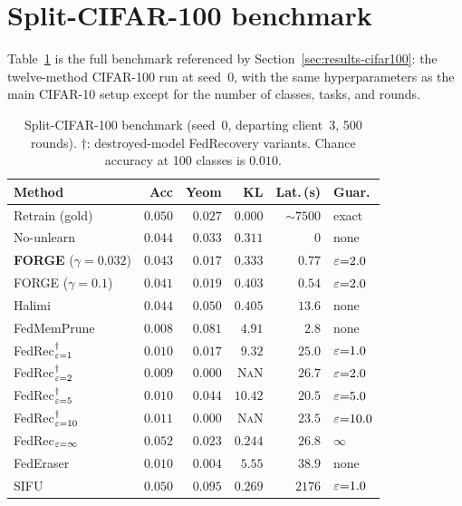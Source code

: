 \section{Split-CIFAR-100 benchmark}
\label{app:cifar100-table}

Table~\ref{tab:cifar100-benchmark} is the full benchmark referenced by
Section~\ref{sec:results-cifar100}: the twelve-method CIFAR-100 run at seed~$0$,
with the same hyperparameters as the main CIFAR-10 setup except for the number of
classes, tasks, and rounds.

\begin{table}[h]
\centering
\scriptsize
\setlength{\tabcolsep}{3pt}
\begin{tabular}{lrrrrl}
\toprule
Method & Acc & Yeom & KL & Lat.\,(s) & Guar. \\
\midrule
Retrain (gold) & $0.050$ & $0.027$ & $0.000$ & $\sim 7500$ & exact \\
No-unlearn     & $0.044$ & $0.033$ & $0.311$ & $0$         & none \\
\textbf{FORGE} ($\gamma{=}0.032$) & $\mathbf{0.043}$ & $\mathbf{0.017}$ & $\mathbf{0.333}$ & $\mathbf{0.77}$ & $\varepsilon{=}2.0$ \\
FORGE ($\gamma{=}0.1$)            & $0.041$ & $0.019$ & $0.403$ & $0.54$ & $\varepsilon{=}2.0$ \\
\midrule
Halimi \cite{halimi2022}              & $0.044$ & $0.050$ & $0.405$ & $13.6$ & none \\
FedMemPrune \cite{wei2026fedmemprune} & $0.008$ & $0.081$ & $4.91$  & $2.8$  & none \\
FedRec$^{\dag}_{\varepsilon{=}1}$            & $0.010$ & $0.017$ & $9.32$  & $25.0$ & $\varepsilon{=}1.0$ \\
FedRec$^{\dag}_{\varepsilon{=}2}$            & $0.009$ & $0.000$ & \textsc{NaN} & $26.7$ & $\varepsilon{=}2.0$ \\
FedRec$^{\dag}_{\varepsilon{=}5}$            & $0.010$ & $0.044$ & $10.42$ & $20.5$ & $\varepsilon{=}5.0$ \\
FedRec$^{\dag}_{\varepsilon{=}10}$           & $0.011$ & $0.000$ & \textsc{NaN} & $23.5$ & $\varepsilon{=}10.0$ \\
FedRec$_{\varepsilon{=}\infty}$              & $0.052$ & $0.023$ & $0.244$ & $26.8$ & $\infty$ \\
FedEraser \cite{liu2021federaser}     & $0.010$ & $0.004$ & $5.55$  & $38.9$ & none \\
SIFU \cite{fraboni2024sifu}           & $0.050$ & $0.095$ & $0.269$ & $2176$ & $\varepsilon{=}1.0$ \\
\bottomrule
\end{tabular}
\caption{Split-CIFAR-100 benchmark (seed~$0$, departing client~$3$, 500 rounds).
$\dag$: destroyed-model FedRecovery variants. Chance accuracy at 100 classes is
$0.010$.}
\label{tab:cifar100-benchmark}
\end{table}
